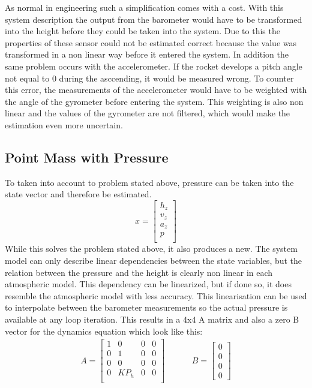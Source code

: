   As normal in engineering such a simplification comes with a cost. With this system description the output from the barometer would have
  to be transformed into the height before they could be taken into the system. 
  Due to this the properties of these sensor could not be estimated correct because the value was transformed in a non linear way before it entered the system.
  In addition the same problem occurs with the accelerometer. If the rocket develops a pitch angle not equal to 0 during the asccending, it would be measured wrong.
  To counter this error, the measurements of the accelerometer would have to be weighted with the angle of the gyrometer before entering the system.
  This weighting is also non linear and the values of the gyrometer are not filtered, which would make the estimation even more uncertain.
  
  \subsection{Point Mass with Pressure}
  To taken into account to problem stated above, pressure can be taken into the state vector and therefore be estimated.
  $$ x = \begin{bmatrix}
  h_z\\
  v_z\\
  a_z\\
  p\\
  \end{bmatrix} $$ 
  While this solves the problem stated above, it also produces a new. The system model can only describe linear dependencies between the state variables,
  but the relation between the pressure and the height is clearly non linear in each atmospheric model.
  This dependency can be linearized, but if done so, it does resemble the atmospheric model with less accuracy.
  This linearisation can be used to interpolate between the barometer measurements so the actual pressure is available at any loop iteration.
  This results in a 4x4 A matrix and also a zero B vector for the dynamics equation which look like this:
  \begin{align*}
  A = \begin{bmatrix}
         1    & 0 & 0 & 0    \\
         0    & 1 & 0 & 0    \\
         0    & 0 & 0 & 0    \\
         0    & KP_h & 0 & 0\\
        \end{bmatrix}
        & \hspace{1cm}
    B = \begin{bmatrix}
       0 \\
       0 \\
       0 \\
       0
      \end{bmatrix}
  \end{align*}  
  
